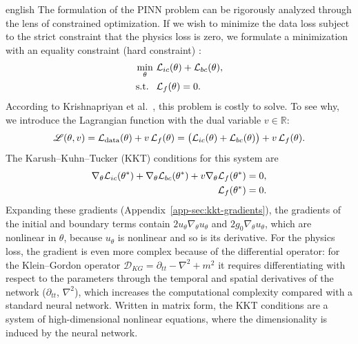 \documentclass[../0000.tex]{subfiles}
\begin{document}
\begin{hyphenrules}{english}
The formulation of the PINN problem can be rigorously analyzed through the lens of constrained
optimization. If we wish to minimize the data loss subject to the strict constraint that the physics
loss is zero, we formulate a minimization with an equality constraint (hard constraint)
\cite{krishnapriyan2021}:
\begin{align}
  \min_{\theta}\ &\mathcal{L}_{ic}(\theta)+\mathcal{L}_{bc}(\theta), \label{eq:hard-obj}\\
  \text{s.t. }\ &\mathcal{L}_f(\theta)=0. \label{eq:hard-constraint}
\end{align}
According to Krishnapriyan et al.~\cite{krishnapriyan2021}, this problem is costly to solve. To see why, we introduce the
Lagrangian function with the dual variable $v\in\mathbb{R}$:
\begin{equation}
  \mathscr{L}(\theta,v)=\mathcal{L}_{\mathrm{data}}(\theta)+v\,\mathcal{L}_f(\theta)
  =\big(\mathcal{L}_{ic}(\theta)+\mathcal{L}_{bc}(\theta)\big)+v\,\mathcal{L}_f(\theta).
  \label{eq:lagrangian}
\end{equation}
The Karush--Kuhn--Tucker (KKT) conditions for this system are \cite{boyd2004}
\begin{align}
  \nabla_\theta\mathcal{L}_{ic}(\theta^{*})+\nabla_\theta\mathcal{L}_{bc}(\theta^{*})+v\nabla_\theta\mathcal{L}_f(\theta^{*})&=0, \label{eq:kkt-1}\\
  \mathcal{L}_f(\theta^{*})&=0. \label{eq:kkt-2}
\end{align}
Expanding these gradients (Appendix~\ref{app-sec:kkt-gradients}), the gradients of the initial and boundary
terms contain $2u_\theta\nabla_\theta u_\theta$ and $2g_0\nabla_\theta u_\theta$, which are nonlinear in
$\theta$, because $u_\theta$ is nonlinear and so is its derivative. For the physics loss, the gradient is
even more complex because of the differential operator: for the Klein--Gordon operator
$\mathcal{D}_{KG}=\partial_{tt}-\nabla^2+m^2$ it requires differentiating with respect to the parameters
through the temporal and spatial derivatives of the network ($\partial_{tt}$, $\nabla^2$), which increases
the computational complexity compared with a standard neural network. Written in matrix form, the KKT
conditions are a system of high-dimensional nonlinear equations, where the dimensionality is induced by
the neural network.


\end{hyphenrules}
\end{document}
